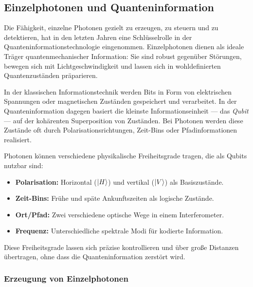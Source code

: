 \subsection{Einzelphotonen und Quanteninformation}

Die Fähigkeit, einzelne Photonen gezielt zu erzeugen, zu steuern und zu detektieren, hat in den letzten Jahren eine Schlüsselrolle in der Quanteninformationstechnologie eingenommen. Einzelphotonen dienen als ideale Träger quantenmechanischer Information: Sie sind robust gegenüber Störungen, bewegen sich mit Lichtgeschwindigkeit und lassen sich in wohldefinierten Quantenzuständen präparieren.

In der klassischen Informationstechnik werden Bits in Form von elektrischen Spannungen oder magnetischen Zuständen gespeichert und verarbeitet. In der Quanteninformation dagegen basiert die kleinste Informationseinheit — das \emph{Qubit} — auf der kohärenten Superposition von Zuständen. Bei Photonen werden diese Zustände oft durch Polarisationsrichtungen, Zeit-Bins oder Pfadinformationen realisiert.
\medskip
\begin{tcolorbox}[physikbox, title=Was macht ein Photon zum Informationsträger? \label{box:photon_information}]
	\small
	Photonen können verschiedene physikalische Freiheitsgrade tragen, die als Qubits nutzbar sind:
	\begin{itemize}
		\item \textbf{Polarisation:} Horizontal ($\ket{H}$) und vertikal ($\ket{V}$) als Basiszustände.
		\item \textbf{Zeit-Bins:} Frühe und späte Ankunftszeiten als logische Zustände.
		\item \textbf{Ort/Pfad:} Zwei verschiedene optische Wege in einem Interferometer.
		\item \textbf{Frequenz:} Unterschiedliche spektrale Modi für kodierte Information.
	\end{itemize}
	Diese Freiheitsgrade lassen sich präzise kontrollieren und über große Distanzen übertragen, ohne dass die Quanteninformation zerstört wird.
\end{tcolorbox}

\subsubsection{Erzeugung von Einzelphotonen}

